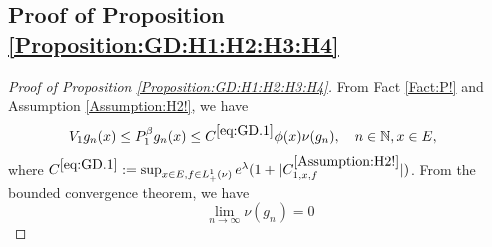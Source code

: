 \documentclass[12pt,a4paper]{amsart}
\numberwithin{equation}{section}
\theoremstyle{plain}
\theoremstyle{definition}
\theoremstyle{remark}
\newcounter{N}
\newcounter{n}[N]
\begin{document}
\subsection{Proof of Proposition \ref{Proposition:GD:H1:H2:H3:H4}}
\begin{proof}[Proof of Proposition \ref{Proposition:GD:H1:H2:H3:H4}]
	\label{sec:GD}
From Fact \ref{Fact:P!} and Assumption \ref{Assumption:H2!}, we have
\begin{align}
\label{eq:GD.1}
&V_1 g_n(x) \leq P^\beta_1 g_n(x) \leq C^{\eqref{eq:GD.1}} \phi(x) \nu(g_n),
\quad n \in \mathbb N, x\in E,
\end{align}
where $C^{\eqref{eq:GD.1}}:= \sup_{x\in E, f\in L_+^1(\nu)}e^{\lambda }(1+|C^{\ref{Assumption:H2!}}_{1,x,f}|)$.
From the bounded convergence theorem, we have
\begin{equation}
\label{eq:GD.11}
\lim_{n\to \infty} \nu(g_n) =0
\end{equation}


\end{proof}
\end{document}
